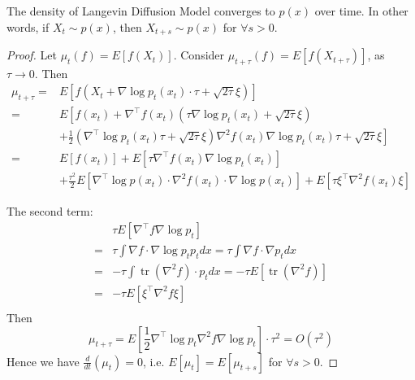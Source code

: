 \begin{theorem}
    The density of Langevin Diffusion Model converges to $p(x)$ over time. In other words, if $X_t\sim p(x)$, then $X_{t+s}\sim p(x)$ for $\forall s>0$. 
\end{theorem}
\begin{proof}
    Let  $\mu_{t}(f)=E\left[f\left(X_{t}\right)\right]$. Consider  $\mu_{t+\tau}(f)=E\left[f\left(X_{t+\tau}\right)\right]$, as $\tau \rightarrow 0$. Then  
\begin{equation}
    \begin{aligned}
        \mu_{t+\tau}=&E\left[f\left(X_{t}+\nabla \log p_t\left(x_{t}\right) \cdot \tau+\sqrt{2 \tau} \xi\right)\right]\\
        =&E\left[f\left(x_{t}\right)+\nabla^{\top} f\left(x_{t}\right)\left(\tau \nabla \log p_t\left(x_{t}\right)+\sqrt{2 \tau} \xi\right)\right. \\
        &+\frac{1}{2}\left.\left(\nabla^{\top}\log p_t(x_t)\tau + \sqrt{2\tau}\xi\right)\nabla^2f(x_t)\nabla\log p_t(x_t)\tau + \sqrt{2\tau}\xi\right]\\
        =&E\left[f\left(x_{t}\right)\right]+E\left[\tau \nabla^{\top}f\left(x_{t}\right) \nabla \log p_t\left(x_{t}\right)\right]\\
        &+\frac{\tau^{2}}{2} E\left[\nabla^{\top} \log p\left(x_{t}\right) \cdot \nabla^{2} f\left(x_{t}\right) \cdot \nabla \log p\left(x_{t}\right)\right] +E\left[\tau \xi^{\top} \nabla^{2} f\left(x_{t}\right) \xi\right]
    \end{aligned}
\end{equation}
 
The second term:
\begin{equation}
    \begin{aligned}
        &\tau E\left[\nabla^{\top} f \nabla \log p_{t}\right] \\
        =&\tau \int \nabla f \cdot \nabla \log p_{t} p_{t} d x=\tau \int \nabla f \cdot \nabla p_{t} d x \\
        =&-\tau \int \operatorname{tr}\left(\nabla^{2} f\right) \cdot p_{t} d x=-\tau E\left[\operatorname{tr}\left(\nabla^{2} f\right)\right]\\
        =&-\tau E\left[\xi^{\top} \nabla^{2} f \xi\right] \\
    \end{aligned}
\end{equation}
Then 
\begin{equation}
    \mu_{t+\tau} =E\left[\frac{1}{2} \nabla^{\top} \log p_{t} \nabla^{2} f \nabla \log p_{t}\right] \cdot \tau^{2}=O\left(\tau^{2}\right)
\end{equation}
Hence we have $\frac{d}{dt}(\mu_t)=0$, i.e. $E[\mu_t]=E[\mu_{t+s}]$ for $\forall s>0$.
\end{proof}

